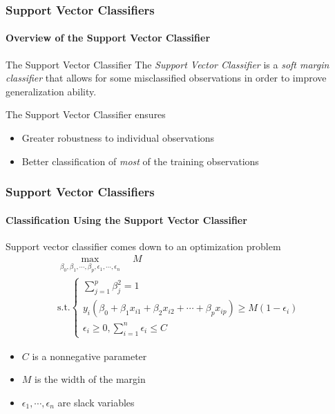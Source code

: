 \documentclass{beamer}
\begin{document}
\begin{frame}
    \frametitle{Support Vector Classifiers}
    \framesubtitle{Overview of the Support Vector Classifier}
    \begin{block}{The Support Vector Classifier}
    The \textit{Support Vector Classifier} is a \textit{soft margin classifier} 
    that allows for some misclassified observations in order to improve 
    generalization ability.
    \end{block}

    The Support Vector Classifier ensures
    \begin{itemize}
        \item Greater robustness to individual observations
        \item Better classification of \textit{most} of the training observations
    \end{itemize}
\end{frame}

\begin{frame}
    \frametitle{Support Vector Classifiers}
    \framesubtitle{Classification Using the Support Vector Classifier}
    Support vector classifier comes down to an optimization problem
    \begin{gather*}
        \underset{\beta_0,\beta_1,\cdots,\beta_p,\epsilon_1,\cdots,\epsilon_n}{\max} 
        \quad M \quad \\
        \text{s.t.}
        \begin{cases}
            \sum_{j=1}^{p}\beta_j^2=1 \\
            y_i(\beta_0+\beta_1x_{i1}+\beta_2x_{i2}+\cdots+\beta_px_{ip})\geq M(1-\epsilon_i) \\
            \epsilon_i \geq 0, \sum_{i=1}^n\epsilon_i \leq C
        \end{cases}
    \end{gather*}

    \begin{itemize}
        \item $C$ is a nonnegative parameter
        \item $M$ is the width of the margin
        \item $\epsilon_1,\cdots, \epsilon_n$ are slack variables
    \end{itemize}
\end{frame}
\end{document}

